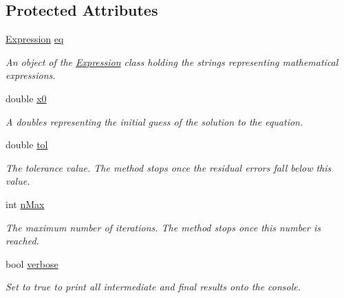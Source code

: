 \subsection*{Protected Attributes}
\begin{DoxyCompactItemize}
\item 
\hyperlink{class_expression}{Expression} \hyperlink{class_nonlinear_solver_aad588fc96d07cf310a13ae11b51ce550}{eq}\hypertarget{class_nonlinear_solver_aad588fc96d07cf310a13ae11b51ce550}{}\label{class_nonlinear_solver_aad588fc96d07cf310a13ae11b51ce550}

\begin{DoxyCompactList}\small\item\em An object of the \hyperlink{class_expression}{Expression} class holding the strings representing mathematical expressions. \end{DoxyCompactList}\item 
double \hyperlink{class_nonlinear_solver_a0af503b5f79fd74a61b1ba8c956e9a06}{x0}\hypertarget{class_nonlinear_solver_a0af503b5f79fd74a61b1ba8c956e9a06}{}\label{class_nonlinear_solver_a0af503b5f79fd74a61b1ba8c956e9a06}

\begin{DoxyCompactList}\small\item\em A doubles representing the initial guess of the solution to the equation. \end{DoxyCompactList}\item 
double \hyperlink{class_nonlinear_solver_a8fa50d85cb58f69da6cddf52a2b950af}{tol}\hypertarget{class_nonlinear_solver_a8fa50d85cb58f69da6cddf52a2b950af}{}\label{class_nonlinear_solver_a8fa50d85cb58f69da6cddf52a2b950af}

\begin{DoxyCompactList}\small\item\em The tolerance value. The method stops once the residual errors fall below this value. \end{DoxyCompactList}\item 
int \hyperlink{class_nonlinear_solver_accd5129e5d683f9d8187bd9d4d13b023}{n\+Max}\hypertarget{class_nonlinear_solver_accd5129e5d683f9d8187bd9d4d13b023}{}\label{class_nonlinear_solver_accd5129e5d683f9d8187bd9d4d13b023}

\begin{DoxyCompactList}\small\item\em The maximum number of iterations. The method stops once this number is reached. \end{DoxyCompactList}\item 
bool \hyperlink{class_nonlinear_solver_a81db23a90d44eeea9b9ec57d8ea94155}{verbose}\hypertarget{class_nonlinear_solver_a81db23a90d44eeea9b9ec57d8ea94155}{}\label{class_nonlinear_solver_a81db23a90d44eeea9b9ec57d8ea94155}

\begin{DoxyCompactList}\small\item\em Set to true to print all intermediate and final results onto the console. \end{DoxyCompactList}\end{DoxyCompactItemize}


